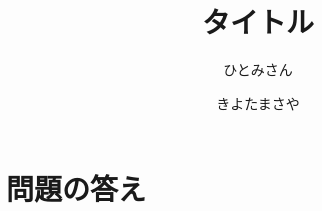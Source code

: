 \documentclass[book]{jlreq}
\title{タイトル}
\author{ひとみさん\and きよたまさや}
\newcommand{\途中}[1]{
	\begin{tcolorbox}[%
		enhanced, sharp corners, frame hidden,%
		borderline={1pt}{0mm}{dotted},%
	]%
	\noindent\phantom{0}\hfill 執筆途中\hfill\phantom{0}\par
	#1
	\end{tcolorbox}\par
}
\begin{document}
\maketitle



\tableofcontents

\appendix

\part{問題の答え}
\end{document}
